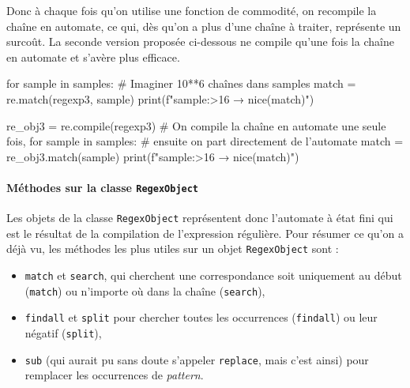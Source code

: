 Donc à chaque fois qu'on utilise une fonction de commodité, on recompile la chaîne en automate, ce qui, dès qu'on a plus d'une chaîne à traiter, représente un surcoût. La seconde version proposée ci-dessous ne compile qu'une fois la chaîne en automate et s'avère plus efficace.

\begin{idleconsole*}
	\begin{pyconsole}
for sample in samples: # Imaginer 10**6 chaînes dans samples
    match = re.match(regexp3, sample)
    print(f"{sample:>16} → {nice(match)}")

re_obj3 = re.compile(regexp3) # On compile la chaîne en automate une seule fois,
for sample in samples:        # ensuite on part directement de l'automate
    match = re_obj3.match(sample)
    print(f"{sample:>16} → {nice(match)}")

\end{pyconsole}
\end{idleconsole*}

\vspace{1pt}%

\paragraph{Méthodes sur la classe {\normalfont\texttt{RegexObject}}}
Les objets de la classe \texttt{RegexObject} représentent donc l'automate à état fini qui est le résultat de la compilation de l'expression régulière. Pour résumer ce qu'on a déjà vu, les méthodes les plus utiles sur un objet \texttt{RegexObject} sont :
\begin{itemize}
\item \texttt{match} et \texttt{search}, qui cherchent une correspondance soit uniquement au début (\texttt{match}) ou n'importe où dans la chaîne (\texttt{search}),
\item \texttt{findall} et \texttt{split} pour chercher toutes les occurrences (\texttt{findall}) ou leur négatif (\texttt{split}),
\item \texttt{sub} (qui aurait pu sans doute s'appeler \texttt{replace}, mais c'est ainsi) pour remplacer les occurrences de \textit{pattern}.
\end{itemize}

